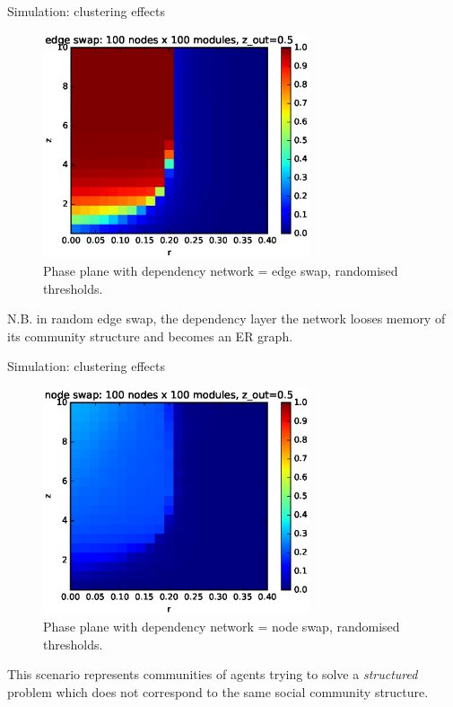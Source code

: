 \documentclass[10pt, xcolor=dvipsnames, handout]{beamer}
\begin{document}
\begin{frame}{Simulation: clustering effects}

\begin{figure}
\centering
\includegraphics[width=0.7\textwidth]{figures/pp_double_edge_swap_100x100}
\caption{Phase plane with dependency network = edge swap, randomised thresholds. }
\end{figure}

N.B. in random edge swap, the dependency layer the network looses memory of its community structure and becomes an ER graph.

\end{frame}
\begin{frame}{Simulation: clustering effects}

\begin{figure}
\centering
\includegraphics[width=0.7\textwidth]{figures/pp_double_node_swap_100x100}
\caption{Phase plane with dependency network = node swap, randomised thresholds. }
\end{figure}

This scenario represents communities of agents trying to solve a \emph{structured} problem which does not correspond to the same social community structure.
\end{frame}
\end{document}
